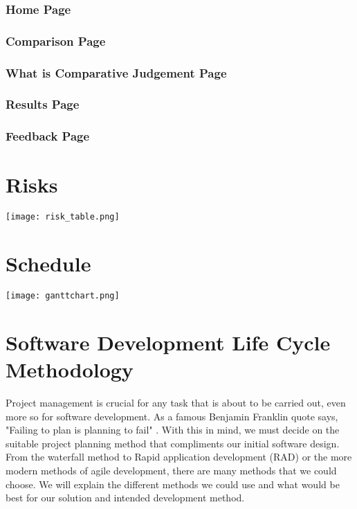 \subsection{Home Page}

\subsection{Comparison Page}

\subsection{What is Comparative Judgement Page}

\subsection{Results Page}

\subsection{Feedback Page}


\chapter{Risks}


\begin{center}
	\texttt{[image: risk\_table.png]}
\end{center}



\chapter{Schedule}
\begin{landscape}
	
	\begin{center}
		\item\texttt{[image: ganttchart.png]}
	\end{center}
\end{landscape}

\chapter{Software Development Life Cycle Methodology}
Project management is crucial for any task that is about to be carried out, even more so for software development. As a famous Benjamin Franklin quote says, "Failing to plan is planning to fail" \cite{plan_to_fail}. With this in mind, we must decide on the suitable project planning method that compliments our initial software design. From the waterfall method to Rapid application development (RAD) or the more modern methods of agile development, there are many methods that we could choose. We will explain the different methods we could use and what would be best for our solution and intended development method.

